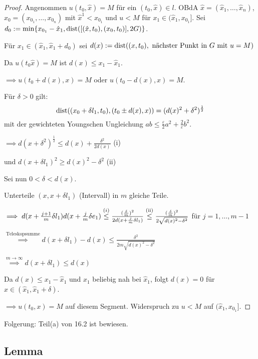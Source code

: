 \begin{proof}
  Angenommen $u(t_0, \hat x) = M$ für ein $(t_0, \hat x) \in l$. OBdA $\hat x = (\hat x_1, \dots, \hat x_n)$, $x_0 = (x_{0_1}, \dots, x_{0_n})$ mit $\hat x^1 < x_{0_1}$ und $u < M$ für $x_1 \in (\hat x_1, x_{0_1}]$.
  Sei $d_0 := \min\{ x_{0_1} - \hat x_1, \operatorname{dist}([(\hat x, t_0), (x_0, t_0)], 2G) \}$.

  Für $x_1 \in (\hat x_1, \hat x_1 + d_0)$ sei $d(x) := \operatorname{dist}((x,t_0), \text{ nächster Punkt in $G$ mit $u = M$})$

  Da $u(t_0 \hat x) = M$ ist $d(x) \leq x_1 - \hat x_1$.

  $\implies u(t_0 + d(x), x) = M$ oder $u(t_0 - d(x), x) = M$.

  Für $\delta > 0$ gilt:
  $$
  \operatorname{dist}((x_0 + \delta l_1, t_0), (t_0 \pm d(x), x)) = (d(x)^2 + \delta^2)^{\frac{1}{2}}
  $$
  mit der gewichteten Youngschen Ungleichung $a b \leq \frac{\varepsilon}{2} a^2 + \frac{2}{\varepsilon} b^2$.

  $\implies d(x + \delta^2)^{\frac{1}{2}} \leq d(x) + \frac{\delta^2}{2d(x)}$ (i)

  und $d(x + \delta l_1)^2 \geq d(x)^2 - \delta^2 $ (ii)

  Sei nun $0 < \delta < d(x)$.

  Unterteile $(x, x + \delta l_1)$ (Intervall) in $m$ gleiche Teile.
  
  $\implies d(x + \frac{j + 1}{m} \delta l_1)  d(x + \frac{j}{m} \delta e_1) \overset{\text(i)}{\leq} \frac{(\frac{\delta}{m})^2}{2d(x + \frac{j}{m} \delta l_1)} \overset{\text{(ii)}}{\leq} \frac{(\frac{\delta}{m})^2}{2 \sqrt{d(x)^2 - \delta^2}}$ für $j = 1, \dots, m-1$

  $\overset{\text{Teleskopsumme}}{\implies} d(x + \delta l_1) - d(x) \leq \frac{\delta^2}{2m \sqrt{d(x)^2 - \delta^2}}$

  $\overset{m \to \infty}{\implies} d(x + \delta l_1) \leq d(x)$

  Da $d(x) \leq x_1 - \hat x_1$ und $x_1$ beliebig nah bei $\hat x_1$, folgt $d(x) = 0$ für $x \in (\hat x_1, \hat x_1 + \delta)$.

  $\implies u(t_0, x) = M$ auf diesem Segment. Widerspruch zu $u < M$ auf $(\hat x_1, x_{0_1}]$.
\end{proof}

Folgerung: Teil(a) von 16.2 ist bewiesen.

\subsection{Lemma}


